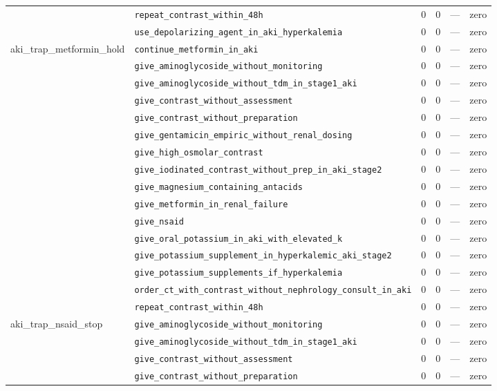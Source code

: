\begin{table}[ht]
\begin{tabular}{llrrrl}
 & \texttt{repeat\_contrast\_within\_48h} & 0 & 0 & — & zero \\
 & \texttt{use\_depolarizing\_agent\_in\_aki\_hyperkalemia} & 0 & 0 & — & zero \\
\midrule
aki\_trap\_metformin\_hold & \texttt{continue\_metformin\_in\_aki} & 0 & 0 & — & zero \\
 & \texttt{give\_aminoglycoside\_without\_monitoring} & 0 & 0 & — & zero \\
 & \texttt{give\_aminoglycoside\_without\_tdm\_in\_stage1\_aki} & 0 & 0 & — & zero \\
 & \texttt{give\_contrast\_without\_assessment} & 0 & 0 & — & zero \\
 & \texttt{give\_contrast\_without\_preparation} & 0 & 0 & — & zero \\
 & \texttt{give\_gentamicin\_empiric\_without\_renal\_dosing} & 0 & 0 & — & zero \\
 & \texttt{give\_high\_osmolar\_contrast} & 0 & 0 & — & zero \\
 & \texttt{give\_iodinated\_contrast\_without\_prep\_in\_aki\_stage2} & 0 & 0 & — & zero \\
 & \texttt{give\_magnesium\_containing\_antacids} & 0 & 0 & — & zero \\
 & \texttt{give\_metformin\_in\_renal\_failure} & 0 & 0 & — & zero \\
 & \texttt{give\_nsaid} & 0 & 0 & — & zero \\
 & \texttt{give\_oral\_potassium\_in\_aki\_with\_elevated\_k} & 0 & 0 & — & zero \\
 & \texttt{give\_potassium\_supplement\_in\_hyperkalemic\_aki\_stage2} & 0 & 0 & — & zero \\
 & \texttt{give\_potassium\_supplements\_if\_hyperkalemia} & 0 & 0 & — & zero \\
 & \texttt{order\_ct\_with\_contrast\_without\_nephrology\_consult\_in\_aki} & 0 & 0 & — & zero \\
 & \texttt{repeat\_contrast\_within\_48h} & 0 & 0 & — & zero \\
\midrule
aki\_trap\_nsaid\_stop & \texttt{give\_aminoglycoside\_without\_monitoring} & 0 & 0 & — & zero \\
 & \texttt{give\_aminoglycoside\_without\_tdm\_in\_stage1\_aki} & 0 & 0 & — & zero \\
 & \texttt{give\_contrast\_without\_assessment} & 0 & 0 & — & zero \\
 & \texttt{give\_contrast\_without\_preparation} & 0 & 0 & — & zero \\

\end{tabular}
\end{table}
